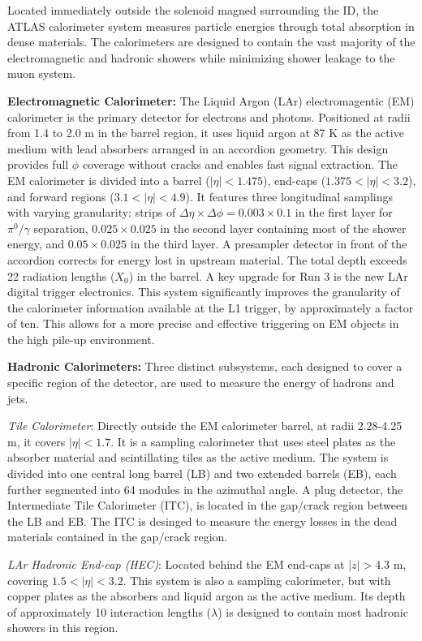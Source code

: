 Located immediately outside the solenoid magned surrounding the ID, the ATLAS calorimeter system measures particle energies through total absorption in dense materials. The calorimeters are designed to contain the vast majority of the electromagnetic and hadronic showers while minimizing shower leakage to the muon system.

\textbf{Electromagnetic Calorimeter:} The Liquid Argon (LAr) electromagentic (EM) calorimeter is the primary detector for electrons and photons. Positioned at radii from 1.4 to 2.0 m in the barrel region, it uses liquid argon at 87 K as the active medium with lead absorbers arranged in an accordion geometry. This design provides full $\phi$ coverage without cracks and enables fast signal extraction. The EM calorimeter is divided into a barrel ($|\eta| < 1.475$), end-caps ($1.375 < |\eta| < 3.2$), and forward regions ($3.1 < |\eta| < 4.9$). It features three longitudinal samplings with varying granularity: strips of $\Delta\eta \times \Delta\phi = 0.003 \times 0.1$ in the first layer for $\pi^0/\gamma$ separation, $0.025 \times 0.025$ in the second layer containing most of the shower energy, and $0.05 \times 0.025$ in the third layer. A presampler detector in front of the accordion corrects for energy lost in upstream material. The total depth exceeds 22 radiation lengths ($X_0$) in the barrel. A key upgrade for Run 3 is the new LAr digital trigger electronics. This system significantly improves the granularity of the calorimeter information available at the L1 trigger, by approximately a factor of ten. This allows for a more precise and effective triggering on EM objects in the high pile-up environment.


\textbf{Hadronic Calorimeters:} Three distinct subsystems, each designed to cover a specific region of the detector, are used to measure the energy of hadrons and jets.


\textit{Tile Calorimeter}: Directly outside the EM calorimeter barrel, at radii 2.28-4.25 m, it covers $|\eta| < 1.7$. It is a sampling calorimeter that uses steel plates as the absorber material and scintillating tiles as the active medium. The system is divided into one central long barrel (LB) and two extended barrels (EB), each further segmented into 64 modules in the azimuthal angle. A plug detector, the Intermediate Tile Calorimeter (ITC), is located in the gap/crack region between the LB and EB. The ITC is desinged to measure the energy losses in the dead materials contained in the gap/crack region.

\textit{LAr Hadronic End-cap (HEC)}: Located behind the EM end-caps at $|z| > 4.3$ m, covering $1.5 < |\eta| < 3.2$. This system is also a sampling calorimeter, but with copper plates as the absorbers and liquid argon as the active medium. Its depth of approximately 10 interaction lengths ($\lambda$) is designed to contain most hadronic showers in this region.


